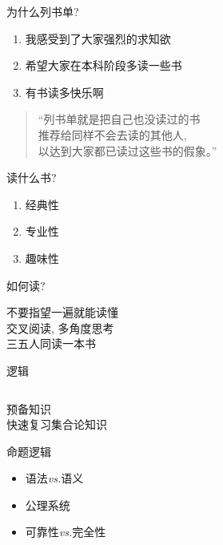 \begin{frame}{为什么列书单?}
  \begin{enumerate}
    \setlength{\itemsep}{8pt}
    \item 我感受到了大家强烈的求知欲
    \item 希望大家在本科阶段多读一些书
    \item 有书读多快乐啊
  \end{enumerate}

  \vspace{0.80cm}
  \begin{quote}
    \centering
    ``列书单就是把自己也没读过的书\\[3pt]
    推荐给同样不会去读的其他人,\\[3pt]
    以达到大家都已读过这些书的假象。''
  \end{quote}
\end{frame}

\begin{frame}{读什么书?}
  \begin{enumerate}
    \setlength{\itemsep}{6pt}
    \centering
    \item 经典性
    \item 专业性
    \item 趣味性
  \end{enumerate}
\end{frame}

\begin{frame}{如何读?}
  \begin{center}
    不要指望一遍就能读懂\\[10pt]

    交叉阅读, 多角度思考\\[10pt]

    三五人同读一本书\\
  \end{center}
\end{frame}

\begin{frame}{逻辑}
  \begin{columns}
      \begin{description}
	\setlength{\itemsep}{6pt}
	\item[第一章] 预备知识 \\
	  快速复习集合论知识
	\item[第二章] 命题逻辑 \\
	  \begin{itemize}
	    \item 语法\emph{vs.}语义
	    \item 公理系统
	    \item 可靠性\emph{vs.}完全性
	  \end{itemize}
      \end{description}
  \end{columns}
\end{frame}

